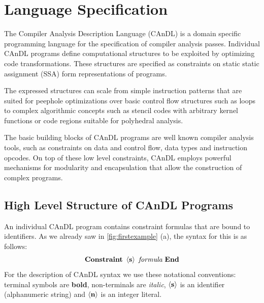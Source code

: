 \begin{figure}[p]
    
    \label{fig:candlexample}
\end{figure}

\section{Language Specification}

    The Compiler Analysis Description Language (CAnDL) is a domain specific
    programming language for the specification of compiler analysis
    passes. 
    Individual CAnDL programs define computational structures to be exploited by
    optimizing code transformations.
    These structures are specified as constraints on static static assignment
    (SSA) form representations of programs.

    The expressed structures can scale from simple instruction patterns that are
    suited for peephole optimizations over basic control flow structures such as
    loops to complex algorithmic concepts such as stencil codes with arbitrary
    kernel functions or code regions suitable for polyhedral analysis.

    The basic building blocks of CAnDL programs are well known compiler analysis
    tools, such as constraints on data and control flow, data types and
    instruction opcodes.
    On top of these low level constraints, CAnDL employs powerful mechanisms for
    modularity and encapsulation that allow the construction of complex
    programs.

\subsection{High Level Structure of CAnDL Programs}

    An individual CAnDL program contains constraint formulas that are
    bound to identifiers.
    As we already saw in \autoref{fig:firstexample} (a), the syntax for this is
    as follows:
    \begin{align*}
        \text{\bf Constraint}\ \left<\text{\bf s}\right>\ \text{\it formula}\ \text{\bf End}
    \end{align*}
    For the description of CAnDL syntax we use these notational conventions:
    terminal symbols are {\bf bold}, non-terminals are {\it italic},
    $\left<\text{\bf s}\right>$ is an identifier (alphanumeric string) and
    $\left<\text{\bf n}\right>$ is an integer literal.

